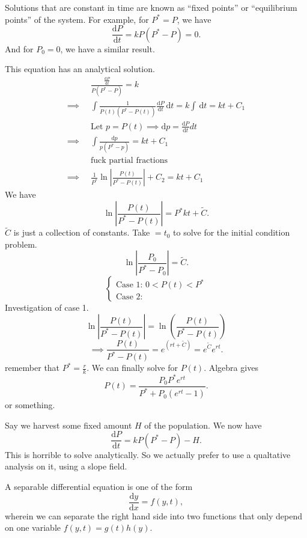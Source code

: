 Solutions that are constant in time are known as ``fixed points'' or ``equilibrium points'' of the system. For example, for $P^*= P$, we have
\[
	\frac{\mathrm{d}P}{\mathrm{d}t} =kP(P^*-P)=0
.\]
And for $P_0=0$, we have a similar result.

This equation has an analytical solution.
\begin{align*}
	\qquad& \frac{\frac{\mathrm{d}P}{\mathrm{d}t} }{P\left( P^* - P \right) }=k\\
	\implies& \int \frac{1}{P(t)\left( P^*-P(t) \right) }\frac{\mathrm{d}P}{\mathrm{d}t}  \,\mathrm{d} t=k\int  \,\mathrm{d} t = kt+C_1\\
		&\text{Let }p=P(t) \implies\mathrm{d} p=\frac{\mathrm{d}P}{\mathrm{d}t} dt\\
	\implies&\int \frac{\mathrm{d}p }{p\left( P^*-p \right) }=kt+C_1\\
		&\text{fuck partial fractions}\\
	\implies&\frac{1}{P^*}\ln \left| \frac{P(t)}{P^*-P(t)} \right| +C_2=kt+C_1
\end{align*}
We have
\[
	\ln \left| \frac{P(t)}{P^*-P(t)} \right| =P^*kt+\tilde{C}
.\]
$\tilde{C}$ is just a collection of constants. Take $=t_0$ to solve for the initial condition problem.
\[
	\ln \left| \frac{P_0}{P^*-P_0} \right| =\tilde{C}
.\]
\[
\begin{cases}
	\text{Case 1: }0<P(t)<P^*\\
	\text{Case 2: }
\end{cases}
\]
Investigation of case 1.
\[
	\ln \left| \frac{P(t)}{P^*-P(t)} \right| =\ln \left( \frac{P(t)}{P^*-P(t)} \right) 
\]
\[
	\implies \frac{P(t)}{P^*-P(t)}=e^{(rt+\tilde{C})}=e^{\tilde{C}}e^{rt}
.\]
remember that $P^* = \frac{r}{k}$. We can finally solve for $P(t)$. Algebra gives
\[
	P(t)=\frac{P_0P^*e^{rt}}{P^*+P_0\left( e^{rt}-1 \right) }
.\]
or something.

Say we harvest some fixed amount $H$ of the population. We now have
\[
	\frac{\mathrm{d}P}{\mathrm{d}t} =kP\left( P^*-P \right) -H
.\]
This is horrible to solve analytically. So we actually prefer to use a qualtative analysis on it, using a slope field.

\begin{definition}\label{dfn:4}
	A separable differential equation is one of the form
	\[
		\frac{\mathrm{d}y}{\mathrm{d}x} =f(y,t)
	,\]
	wherein we can separate the right hand side into two functions that only depend on one variable $f(y,t)=g(t)h(y)$.
\end{definition}

